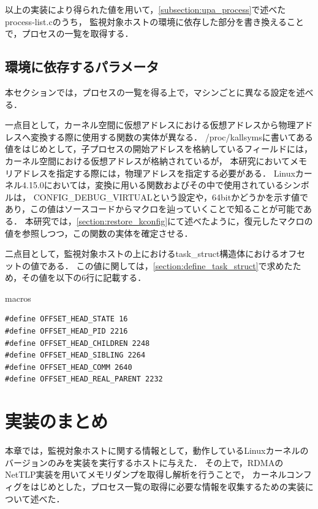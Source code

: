 以上の実装により得られた値を用いて，\ref{subsection:upa_process}で述べたprocess-list.cのうち，
監視対象ホストの環境に依存した部分を書き換えることで，プロセスの一覧を取得する．

\subsection{環境に依存するパラメータ}

本セクションでは，プロセスの一覧を得る上で，マシンごとに異なる設定を述べる．

一点目として，カーネル空間に仮想アドレスにおける仮想アドレスから物理アドレスへ変換する際に使用する関数の実体が異なる．
/proc/kallsymsに書いてある値をはじめとして，子プロセスの開始アドレスを格納しているフィールドには，カーネル空間における仮想アドレスが格納されているが，
本研究においてメモリアドレスを指定する際には，物理アドレスを指定する必要がある．
Linuxカーネル4.15.0においては，変換に用いる関数およびその中で使用されているシンボルは，
CONFIG_DEBUG_VIRTUALという設定や，64bitかどうかを示す値であり，この値はソースコードからマクロを辿っていくことで知ることが可能である．
本研究では，\ref{section:restore_kconfig}にて述べたように，復元したマクロの値を参照しつつ，この関数の実体を確定させる．

二点目として，監視対象ホストの上におけるtask\_struct構造体におけるオフセットの値である．
この値に関しては，\ref{section:define_task_struct}で求めたため，その値を以下の6行に記載する．

\begin{itembox}[l]{macros}
    \begin{verbatim}
#define OFFSET_HEAD_STATE 16
#define OFFSET_HEAD_PID 2216
#define OFFSET_HEAD_CHILDREN 2248
#define OFFSET_HEAD_SIBLING 2264
#define OFFSET_HEAD_COMM 2640
#define OFFSET_HEAD_REAL_PARENT 2232
    \end{verbatim}
\end{itembox}

\section{実装のまとめ}


本章では，監視対象ホストに関する情報として，動作しているLinuxカーネルのバージョンのみを実装を実行するホストに与えた．
その上で，RDMAのNetTLP実装を用いてメモリダンプを取得し解析を行うことで，
カーネルコンフィグをはじめとした，プロセス一覧の取得に必要な情報を収集するための実装について述べた．
